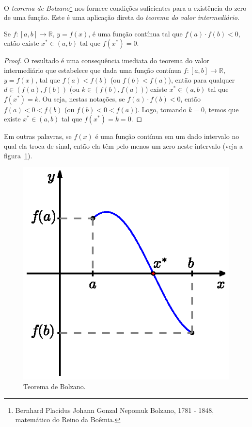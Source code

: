 O \emph{teorema de Bolzano}\footnote{Bernhard Placidus Johann Gonzal Nepomuk Bolzano, 1781 - 1848, matemático do Reino da Boêmia.} nos fornece condições suficientes para a existência do zero de uma função. Este é uma aplicação direta do \emph{teorema do valor intermediário}.

\begin{teo}\label{teo:teorema_de_Bolzano}
  Se $f:[a, b]\to\mathbb{R}$, $y = f(x)$, é uma função contínua tal que $f(a)\cdot f(b) < 0$, então existe $x^*\in (a, b)$ tal que $f(x^*) = 0$.
\end{teo}
\begin{proof}
  O resultado é uma consequência imediata do teorema do valor intermediário que estabelece que dada uma função contínua $f:[a, b]\to\mathbb{R}$, $y = f(x)$, tal que $f(a) < f(b)$ (ou $f(b) < f(a)$), então para qualquer $d\in \left(f(a), f(b)\right)$ (ou $k\in \left(f(b), f(a)\right)$) existe $x^*\in (a, b)$ tal que $f(x^*) = k$. Ou seja, nestas notações, se $f(a)\cdot f(b) < 0$, então $f(a) < 0 < f(b)$ (ou $f(b) < 0 < f(a)$). Logo, tomando $k = 0$, temos que existe $x^*\in (a, b)$ tal que $f(x^*) = k = 0$.
\end{proof}

Em outras palavras, se $f(x)$ é uma função contínua em um dado intervalo no qual ela troca de sinal, então ela têm pelo menos um zero neste intervalo (veja a figura~\ref{fig:teorema_de_Bolzano}).

\begin{figure}
  \centering
  \includegraphics{./cap_equacao1d/pics/teorema_de_Bolzano/teorema_de_Bolzano.eps}
  \caption{Teorema de Bolzano.}
  \label{fig:teorema_de_Bolzano}
\end{figure}

